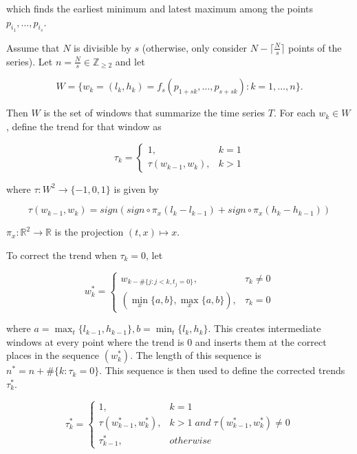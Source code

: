 \documentclass[a4paper, 12pt]{article}
\begin{document}
which finds the earliest minimum and latest maximum among the points $p_{i_1},\dots,p_{i_s}$.

Assume that $N$ is divisible by $s$ (otherwise, only consider $N - \lceil\frac{N}{s} \rceil$ points of the series). Let $n = \frac{N}{s} \in \mathbb{Z}_{\ge 2}$ and let 

\begin{equation*}
    W = \{ w_k = (l_k, h_k) = f_s(p_{1+sk},\dots,p_{s+sk}) : k = 1,\dots,n\}. 
\end{equation*}

Then $W$ is the set of windows that summarize the time series $T$. For each $w_k \in W$, define the trend for that window as 

\begin{equation*}
    \tau_k = \begin{cases}
        1, & k = 1 \\
        \tau(w_{k-1}, w_k), & k > 1
    \end{cases}
\end{equation*}

where $\tau : W^2 \to \{-1,0,1\}$ is given by

\begin{equation*}
    \tau(w_{k-1}, w_k) = sign(sign \circ \pi_x(l_k - l_{k-1}) + sign \circ \pi_x(h_k - h_{k-1}))
\end{equation*}

$\pi_x : \mathbb{R}^2 \to \mathbb{R}$ is the projection $(t,x) \mapsto x$.

To correct the trend when $\tau_k = 0$, let 

\begin{equation*}
    w_k^* = \begin{cases}
        w_{k - \#\{j : j<k, t_j = 0\}}, & \tau_k \ne 0 \\
        (\min_x\{a,b\}, \max_x\{a,b\}), & \tau_k = 0
    \end{cases}
\end{equation*}

where $a = \max_t\{l_{k-1}, h_{k-1}\}, b = \min_t\{l_k, h_k\}$. This creates intermediate windows at every point where the trend is 0 and inserts them at the correct places in the sequence $(w_k^*)$. The length of this sequence is $n^* = n + \#\{k : \tau_k = 0\}$. This sequence is then used to define the corrected trends $\tau_k^*$.

\begin{equation*}
    \tau_k^* = \begin{cases}
        1, & k = 1 \\
        \tau(w_{k-1}^*, w_k^*), & k>1 \; and \;  \tau(w_{k-1}^*, w_k^*) \ne 0 \\
        \tau_{k-1}^*, & otherwise
    \end{cases}
\end{equation*}
\end{document}
